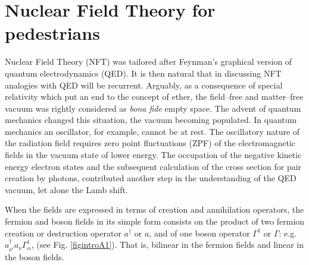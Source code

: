 \section{Nuclear Field Theory for pedestrians}\label{appintroA}

Nuclear Field Theory (NFT) was tailored after Feynman's graphical version of quantum electrodynamics (QED). It is then natural that in discussing NFT analogies with QED will be recurrent.   Arguably, as a consequence of special relativity which put an end to the concept of ether, the field--free and matter--free vacuum was rightly considered as \textit{bona fide} empty space. The advent of quantum mechanics changed this situation, the vacuum becoming populated. In quantum mechanics an oscillator, for example, cannot be at rest. The oscillatory nature of the radiation field requires zero point fluctuations (ZPF) of the electromagnetic fields in the vacuum state of lower energy. The occupation of the negative kinetic energy electron states and the subsequent calculation of the cross section for pair creation by photons, contributed another step in the understanding of the QED vacuum, let alone the Lamb shift.


When the fields are expressed in terms of creation and annihilation operators, the fermion and boson fields in its simple form consists on the product of two fermion creation or destruction operator $a^\dagger$ or $a$, and of one boson operator $\Gamma^\dagger$ or $\Gamma$: e.g. $a^\dagger_{\nu'}a_\nu\Gamma_\alpha^\dagger$, (see Fig. \ref{figintroA1}). That is,  bilinear in the fermion fields and linear in the boson fields.


